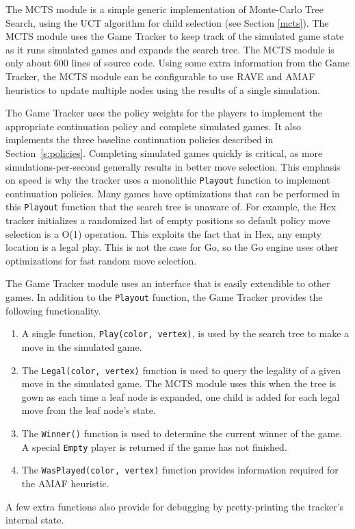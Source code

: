 \documentclass{acm_proc_article-sp}
\begin{document}
The MCTS  module is a simple 
generic implementation of Monte-Carlo Tree Search, using the UCT algorithm for child selection
(see Section \ref{mcts}).
The MCTS module uses the Game Tracker to keep track of the simulated game state 
as it runs simulated games and expands the search tree.
The MCTS module is only about 600 lines of source code. 
Using some extra information from the Game Tracker,  
the MCTS module can be configurable to use RAVE and AMAF heuristics to 
update multiple nodes using the results of a single simulation.  

The Game Tracker uses the policy weights for the players to implement the appropriate continuation policy and complete simulated games. 
It also implements the three baseline continuation policies described in Section~\ref{s:policies}.
Completing simulated games quickly is critical, as more simulations-per-second generally results in better move selection. 
This emphasis on speed is why the tracker uses a monolithic \texttt{Playout} function
to implement continuation policies.
Many games have optimizations that can be performed in this \texttt{Playout} function that the search tree is unaware of. 
For example, the Hex tracker initializes a randomized list of empty positions so default policy move selection is a O(1) operation. 
This exploits the fact that in Hex, any empty location is a legal play. 
This is not the case for Go, so the Go engine uses other optimizations for fast random move selection.

The Game Tracker module uses an interface that is easily extendible to other games. 
In addition to the \texttt{Playout} function, the Game Tracker provides the following functionality.
\begin{enumerate}
\item A single function, \texttt{Play(color, vertex)}, is used by the search tree to make a move in the simulated game.
\item The \texttt{Legal(color, vertex)} function is used to query the legality of a given move in the simulated game. 
The MCTS module uses this when the tree is gown as each time a leaf node is expanded,
one child is added for each legal move from the leaf node's state.
\item The \texttt{Winner()} function is used to determine the current winner of the game. 
	A special \texttt{Empty} player is returned if the game has not finished.
\item The \texttt{WasPlayed(color, vertex)} function provides information required for the AMAF heuristic.
\end{enumerate}
A few extra functions also provide for debugging by pretty-printing the tracker's internal state.
\end{document}
